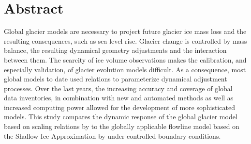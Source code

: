 \chapter*{Abstract}
\thispagestyle{plain}




Global glacier models are necessary to project future glacier ice mass loss and the resulting consequences, such as sea level rise. Glacier change is controlled by  mass balance, the resulting dynamical geometry adjustments and the interaction between them.
The scarcity of ice volume observations makes the calibration, and especially validation, of glacier evolution models difficult. As a consequence, most global models to date used \vas{} relations to parameterize dynamical adjustment processes. Over the last years, the increasing accuracy and coverage of global data inventories, in combination with new and automated methods as well as increased computing power allowed for the development of more sophisticated models. This study compares the dynamic response of the global glacier model based on scaling relations by \citet{Marzeion2012b} to the globally applicable flowline model based on the Shallow Ice Approximation by \citet{Maussion2019} under controlled boundary conditions.

